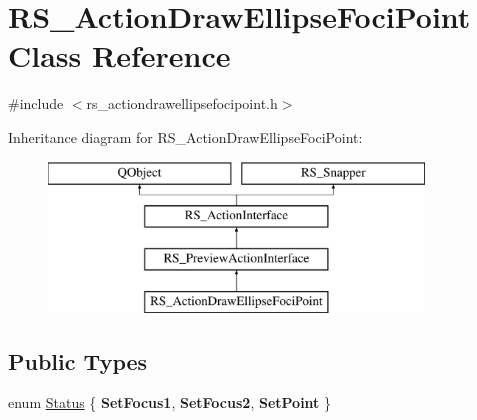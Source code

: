 \hypertarget{classRS__ActionDrawEllipseFociPoint}{\section{R\-S\-\_\-\-Action\-Draw\-Ellipse\-Foci\-Point Class Reference}
\label{classRS__ActionDrawEllipseFociPoint}
}


{\ttfamily \#include $<$rs\-\_\-actiondrawellipsefocipoint.\-h$>$}

Inheritance diagram for R\-S\-\_\-\-Action\-Draw\-Ellipse\-Foci\-Point\-:\begin{figure}[H]
\begin{center}
\leavevmode
\includegraphics[height=4.000000cm]{classRS__ActionDrawEllipseFociPoint}
\end{center}
\end{figure}
\subsection*{Public Types}
\begin{DoxyCompactItemize}
\item 
enum \hyperlink{classRS__ActionDrawEllipseFociPoint_adea60cafc84f0fc17eb11045d00ba6f1}{Status} \{ {\bfseries Set\-Focus1}, 
{\bfseries Set\-Focus2}, 
{\bfseries Set\-Point}
 \}
\end{DoxyCompactItemize}
